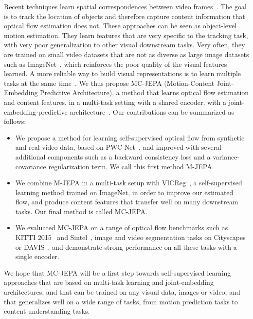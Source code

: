 \documentclass{article} %
\newcommand{\algo}{MC-JEPA}
\newcommand{\algospace}{MC-JEPA }
\begin{document}
Recent techniques learn spatial correspondences between video frames~\citep{jabri2020crw, bian2022mcrw, xu2021vfs, tokmakov2022ram}. The goal is to track the location of objects and therefore capture content information that optical flow estimation does not. These approaches can be seen as object-level motion estimation. They learn features that are very specific to the tracking task, with very poor generalization to other visual downstream tasks. Very often, they are trained on small video datasets that are not as diverse as large image datasets such as ImageNet~\citep{deng2009imagenet}, which reinforces the poor quality of the visual features learned. A more reliable way to build visual representations is to learn multiple tasks at the same time~\citep{zhang2021cover, girdhar2022omnimae}. We thus propose \algospace (Motion-Content Joint-Embedding Predictive Architecture), a method that learns optical flow estimation and content features, in a multi-task setting with a shared encoder, with a joint-embedding-predictive architecture~\citep{lecun2022jepa}. Our contributions can be summarized as follows:
\begin{itemize}
    \item We propose a method for learning self-supervised optical flow from synthetic and real video data, based on PWC-Net~\citep{sun2018pwcnet}, and improved with several additional components such as a backward consistency loss and a variance-covariance regularization term. We call this first method M-JEPA.
    \item We combine M-JEPA in a multi-task setup with VICReg~\citep{bardes2022vicreg}, a self-supervised learning method trained on ImageNet, in order to improve our estimated flow, and produce content features that transfer well on many downstream tasks. Our final method is called \algo.
    \item We evaluated \algospace on a range of optical flow benchmarks such as KITTI 2015~\citep{menze2015kitti15} and Sintel~\citep{butler2012sintel}, image and video segmentation tasks on Cityscapes~\citep{cordts2016cityscapes} or DAVIS~\citep{ponttuset2017davis}, and demonstrate strong performance on all these tasks with a single encoder.
\end{itemize}

We hope that \algospace will be a first step towards self-supervised learning approaches that are based on multi-task learning and joint-embedding architectures, and that can be trained on any visual data, images or video, and that generalizes well on a wide range of tasks, from motion prediction tasks to content understanding tasks.
\end{document}
